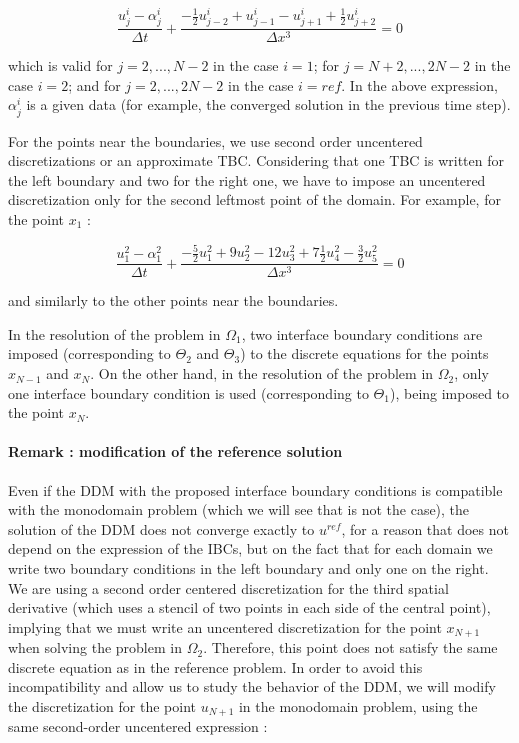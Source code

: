 \begin{equation}
    \label{eq:FDdiscretization}
    \frac{u_j^i - \alpha_j^i}{\Delta t} + \frac{-\frac{1}{2}u_{j-2}^i + u_{j-1}^i - u_{j+1}^i + \frac{1}{2}u_{j+2}^i }{\Delta x ^3} = 0
\end{equation}

\noindent which is valid for $j=2,...,N-2$ in the case $i=1$; for $j=N+2,...,2N-2$ in the case $i=2$; and for $j=2,...,2N-2$ in the case $i=ref$. In the above expression, $\alpha_j^i$ is a given data (for example, the converged solution in the previous time step).

\indent For the points near the boundaries, we use second order uncentered discretizations or an approximate TBC. Considering that one TBC is written for the left boundary and two for the right one, we have to impose an uncentered discretization only for the second leftmost point of the domain. For example, for the point $x_1$ : 

\begin{equation*}
    \frac{u_{1}^2 - \alpha_{1}^2}{\Delta t} + \frac{-\frac{5}{2}u_{1}^2 + 9u_{2}^2 - 12 u_{3}^2 + 7\frac{1}{2}u_{4}^2 -\frac{3}{2}u_{5}^2}{\Delta x ^3} = 0
\end{equation*}

\noindent and similarly to the other points near the boundaries.

\indent In the resolution of the problem in $\Omega_1$, two interface boundary conditions are imposed (corresponding to $\Theta_2$ and $\Theta_3$) to the discrete equations for the points $x_{N-1}$ and $x_N$. On the other hand, in the resolution of the problem in $\Omega_2$, only one interface boundary condition is used (corresponding to $\Theta_1$), being imposed to the point $x_N$.

\paragraph{Remark : modification of the reference solution}

\indent  Even if the DDM with the proposed interface boundary conditions is compatible with the monodomain problem (which we will see that is not the case), the solution of the DDM does not converge exactly to $u^{ref}$, for a reason that does not depend on the expression of the IBCs, but on the fact that for each domain we write two boundary conditions in the left boundary and only one on the right. We are using a second order centered discretization for the third spatial derivative (which uses a stencil of two points in each side of the central point), implying that we must write an uncentered discretization for the point $x_{N+1}$ when solving the problem in $\Omega_2$. Therefore, this point does not satisfy the same discrete equation as in the reference problem. In order to avoid this incompatibility and allow us to study the behavior of the DDM, we will modify the discretization for the point $u_{N+1}$ in the monodomain problem, using the same second-order uncentered expression :


